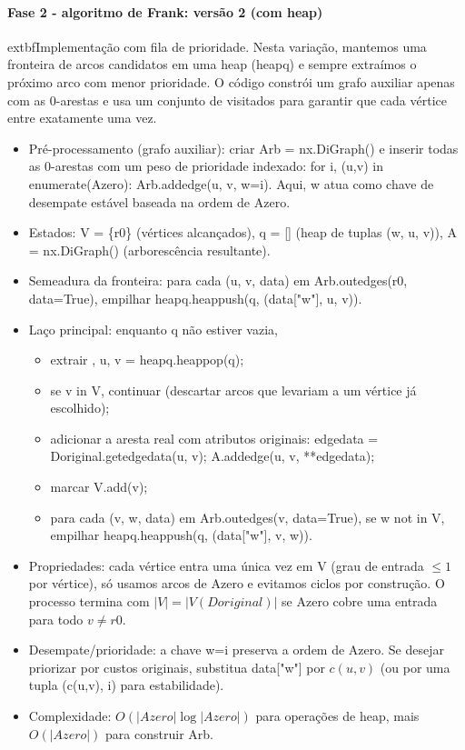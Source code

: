 \documentclass[12pt,a4paper]{article}
\def\texttt#1{#1}%
\def\emph#1{#1}%
\def\_{}%
\begin{document}
\paragraph{Fase 2 - algoritmo de Frank: versão 2 (com heap)}
extbf{Implementação com fila de prioridade.} Nesta variação, mantemos uma \emph{fronteira} de arcos candidatos em uma heap (\texttt{heapq}) e sempre extraímos o próximo arco com menor prioridade. O código constrói um grafo auxiliar apenas com as 0-arestas e usa um conjunto de visitados para garantir que cada vértice entre exatamente uma vez.
\begin{itemize}\setlength{\itemsep}{1pt}
    \item \emph{Pré-processamento (grafo auxiliar):} criar \texttt{Arb = nx.DiGraph()} e inserir todas as 0-arestas com um peso de prioridade indexado: \texttt{for i, (u,v) in enumerate(A\_zero): Arb.add\_edge(u, v, w=i)}. Aqui, \texttt{w} atua como \emph{chave de desempate} estável baseada na ordem de \texttt{A\_zero}.
    \item \emph{Estados:} \texttt{V = \{r0\}} (vértices alcançados), \texttt{q = []} (heap de tuplas \texttt{(w, u, v)}), \texttt{A = nx.DiGraph()} (arborescência resultante).
    \item \emph{Semeadura da fronteira:} para cada \texttt{(u, v, data)} em \texttt{Arb.out\_edges(r0, data=True)}, empilhar \texttt{heapq.heappush(q, (data["w"], u, v))}.
    \item \emph{Laço principal:} enquanto \texttt{q} não estiver vazia,
          \begin{itemize}\setlength{\itemsep}{1pt}
              \item extrair \texttt{\_, u, v = heapq.heappop(q)};
              \item se \texttt{v in V}, continuar (descartar arcos que levariam a um vértice já escolhido);
              \item adicionar a aresta real com atributos originais: \texttt{edge\_data = D\_original.get\_edge\_data(u, v); A.add\_edge(u, v, **edge\_data)};
              \item marcar \texttt{V.add(v)};
              \item para cada \texttt{(v, w, data)} em \texttt{Arb.out\_edges(v, data=True)}, se \texttt{w not in V}, empilhar \texttt{heapq.heappush(q, (data["w"], v, w))}.
          \end{itemize}
    \item \emph{Propriedades:} cada vértice entra uma única vez em \texttt{V} (grau de entrada \(\le 1\) por vértice), só usamos arcos de \texttt{A\_zero} e evitamos ciclos por construção. O processo termina com \(|V| = |V(\texttt{D\_original})|\) se \texttt{A\_zero} cobre uma entrada para todo \(v\neq r0\).
    \item \emph{Desempate/prioridade:} a chave \texttt{w=i} preserva a ordem de \texttt{A\_zero}. Se desejar priorizar por custos originais, substitua \texttt{data["w"]} por \(c(u,v)\) (ou por uma tupla \texttt{(c(u,v), i)} para estabilidade).
    \item \emph{Complexidade:} \(O(|\texttt{A\_zero}| \log |\texttt{A\_zero}|)\) para operações de heap, mais \(O(|\texttt{A\_zero}|)\) para construir \texttt{Arb}.
\end{itemize}
\end{document}
